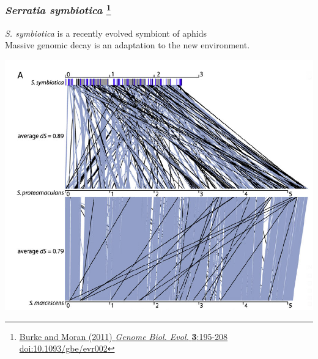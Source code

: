 \begin{frame}
  \frametitle{\textit{Serratia symbiotica} 
  \footnote{\tiny{\href{http://dx.doi.org/10.1093/gbe/evr002}{Burke and Moran (2011) \textit{Genome Biol. Evol.} \textbf{3}:195-208 doi:10.1093/gbe/evr002}}}
  }
  \textit{S. symbiotica} is a recently evolved symbiont of aphids\\
  Massive genomic decay is an adaptation to the new environment.\\
  \begin{center}
    \includegraphics[width=0.75\textheight]{images/s_symbiotica}
  \end{center}    
\end{frame}
